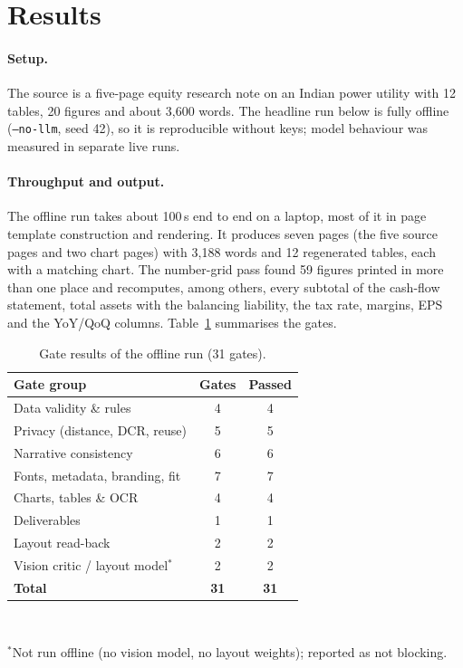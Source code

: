 \documentclass[10pt,twocolumn]{article}
\begin{document}
\section{Results}

\paragraph{Setup.} The source is a five-page equity research note on an Indian power utility with
12 tables, 20 figures and about 3,600 words. The headline run below is fully offline
(\texttt{--no-llm}, seed 42), so it is reproducible without keys; model behaviour was measured in
separate live runs.

\paragraph{Throughput and output.} The offline run takes about 100\,s end to end on a laptop, most
of it in page template construction and rendering. It produces seven pages (the five source pages
and two chart pages) with 3,188 words and 12 regenerated tables, each with a matching chart.
The number-grid pass found 59 figures printed in more than one place and recomputes, among others,
every subtotal of the cash-flow statement, total assets with the balancing liability, the tax rate,
margins, EPS and the YoY/QoQ columns. Table~\ref{tab:gates} summarises the gates.

\begin{table}[t]
\centering
\small
\caption{Gate results of the offline run (31 gates).}
\label{tab:gates}
\begin{tabular}{@{}lcc@{}}
\toprule
Gate group & Gates & Passed \\
\midrule
Data validity \& rules            & 4  & 4 \\
Privacy (distance, DCR, reuse)    & 5  & 5 \\
Narrative consistency             & 6  & 6 \\
Fonts, metadata, branding, fit    & 7  & 7 \\
Charts, tables \& OCR             & 4  & 4 \\
Deliverables                      & 1  & 1 \\
Layout read-back                  & 2  & 2 \\
Vision critic / layout model$^{*}$& 2  & 2 \\
\midrule
\textbf{Total}                    & \textbf{31} & \textbf{31} \\
\bottomrule
\end{tabular}
\\[2pt]
\raggedright\footnotesize $^{*}$Not run offline (no vision model, no layout weights); reported as
not blocking.
\end{table}
\end{document}
